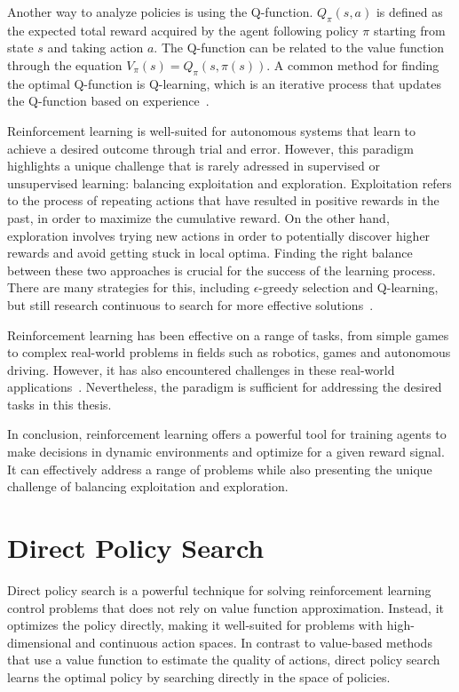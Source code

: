 Another way to analyze policies is using the Q-function. $Q_{\pi}(s, a)$ is defined as the expected total reward acquired by the agent following policy $\pi$ starting from state $s$ and taking action $a$. The Q-function can be related to the value function through the equation $V_{\pi}(s) = Q_{\pi}(s, \pi(s))$. A common method for finding the optimal Q-function is Q-learning, which is an iterative process that updates the Q-function based on experience~\cite{watkins_q-learning_1992}. 


Reinforcement learning is well-suited for autonomous systems that learn to achieve a desired outcome through trial and error. However, this paradigm highlights a unique challenge that is rarely adressed in supervised or unsupervised learning: balancing exploitation and exploration. Exploitation refers to the process of repeating actions that have resulted in positive rewards in the past, in order to maximize the cumulative reward. On the other hand, exploration involves trying new actions in order to potentially discover higher rewards and avoid getting stuck in local optima. Finding the right balance between these two approaches is crucial for the success of the learning process. There are many strategies for this, including $\epsilon$-greedy selection and Q-learning, but still research continuous to search for more effective solutions~\cite{coggan_exploration_2004}.

Reinforcement learning has been effective on a range of tasks, from simple games to complex real-world problems in fields such as robotics, games and autonomous driving. However, it has also encountered challenges in these real-world applications~\cite{zhu_ingredients_2020}. Nevertheless, the paradigm is sufficient for addressing the desired tasks in this thesis.

In conclusion, reinforcement learning offers a powerful tool for training agents to make decisions in dynamic environments and optimize for a given reward signal. It can effectively address a range of problems while also presenting the unique challenge of balancing exploitation and exploration.

\section{Direct Policy Search}
Direct policy search is a powerful technique for solving reinforcement learning control problems that does not rely on value function approximation. Instead, it optimizes the policy directly, making it well-suited for problems with high-dimensional and continuous action spaces. In contrast to value-based methods that use a value function to estimate the quality of actions, direct policy search learns the optimal policy by searching directly in the space of policies.

